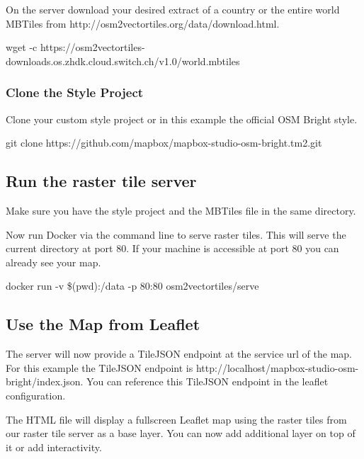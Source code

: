 On the server download your desired extract of a country or the entire
world MBTiles from http://osm2vectortiles.org/data/download.html.

\begin{bashcode}
wget -c https://osm2vectortiles-downloads.os.zhdk.cloud.switch.ch/v1.0/world.mbtiles
\end{bashcode}

\subsubsection{Clone the Style Project}\label{clone-the-style-project}

Clone your custom style project or in this example the official OSM
Bright style.

\begin{bashcode}
git clone https://github.com/mapbox/mapbox-studio-osm-bright.tm2.git
\end{bashcode}

\subsection{Run the raster tile
server}\label{run-the-raster-tile-server}

Make sure you have the style project and the MBTiles file in the same
directory.

Now run Docker via the command line to serve raster tiles. This will
serve the current directory at port 80. If your machine is accessible at
port 80 you can already see your map.

\begin{bashcode}
docker run -v \$(pwd):/data -p 80:80 osm2vectortiles/serve
\end{bashcode}

\subsection{Use the Map from Leaflet}\label{use-the-map-from-leaflet}

The server will now provide a TileJSON endpoint at the service url of
the map. For this example the TileJSON endpoint is
http://localhost/mapbox-studio-osm-bright/index.json. You can reference
this TileJSON endpoint in the leaflet configuration.

The HTML file will display a fullscreen Leaflet map using the raster
tiles from our raster tile server as a base layer. You can now add
additional layer on top of it or add interactivity.

